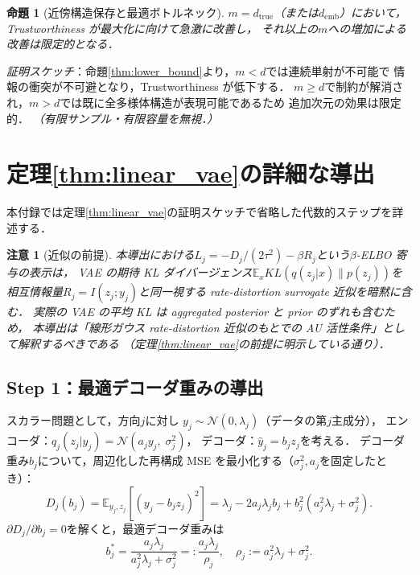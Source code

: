 \documentclass[11pt,a4paper]{jsarticle}
\newtheorem{proposition}{命題}
\newtheorem{remark}{注意}
\newcommand{\dtrue}{d_{\mathrm{true}}}
\newcommand{\demb}{d_{\mathrm{emb}}}
\begin{document}
\begin{proposition}[近傍構造保存と最適ボトルネック]\label{thm:trust}
$m = \dtrue$（または$\demb$）において，Trustworthiness が最大化に向けて急激に改善し，
それ以上の$m$への増加による改善は限定的となる．
\end{proposition}
\textit{証明スケッチ}：命題\ref{thm:lower_bound}より，$m < d$では連続単射が不可能で
情報の衝突が不可避となり，Trustworthiness が低下する．
$m \geq d$で制約が解消され，$m > d$では既に全多様体構造が表現可能であるため
追加次元の効果は限定的．
\textit{（有限サンプル・有限容量を無視．）}

\section{定理\ref{thm:linear_vae}の詳細な導出}\label{app:linear_vae_proof}

本付録では定理\ref{thm:linear_vae}の証明スケッチで省略した代数的ステップを詳述する．

\begin{remark}[近似の前提]
本導出における$L_j = -D_j/(2\tau^2) - \beta R_j$という$\beta$-ELBO 寄与の表示は，
VAE の期待 KL ダイバージェンス$\mathbb{E}_x KL(q(z_j|x)\|p(z_j))$を
相互情報量$R_j = I(z_j; y_j)$と同一視する rate-distortion surrogate 近似を暗黙に含む．
実際の VAE の平均 KL は aggregated posterior と prior のずれも含むため，
本導出は「線形ガウス rate-distortion 近似のもとでの AU 活性条件」として解釈するべきである
（定理\ref{thm:linear_vae}の前提に明示している通り）．
\end{remark}

\subsection*{Step 1：最適デコーダ重みの導出}

スカラー問題として，方向$j$に対し
$y_j \sim \mathcal{N}(0, \lambda_j)$（データの第$j$主成分），
エンコーダ：$q_j(z_j | y_j) = \mathcal{N}(a_j y_j,\; \sigma_j^2)$，
デコーダ：$\hat{y}_j = b_j z_j$を考える．
デコーダ重み$b_j$について，周辺化した再構成 MSE を最小化する（$\sigma_j^2, a_j$を固定したとき）：
\begin{equation}
  D_j(b_j) = \mathbb{E}_{y_j, z_j}[(y_j - b_j z_j)^2]
  = \lambda_j - 2 a_j \lambda_j b_j + b_j^2 (a_j^2 \lambda_j + \sigma_j^2).
  \label{eq:Dj_raw}
\end{equation}
$\partial D_j / \partial b_j = 0$を解くと，最適デコーダ重みは
\begin{equation}
  b_j^* = \frac{a_j \lambda_j}{a_j^2 \lambda_j + \sigma_j^2}
         =: \frac{a_j \lambda_j}{\rho_j},
  \quad \rho_j := a_j^2 \lambda_j + \sigma_j^2.
  \label{eq:bj_opt}
\end{equation}
\end{document}
